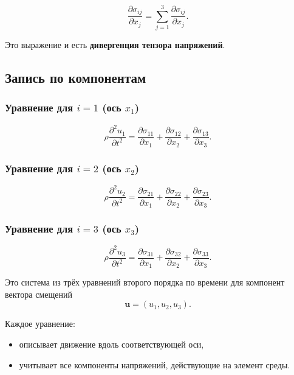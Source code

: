 \[
\frac{\partial \sigma_{ij}}{\partial x_j}
=
\sum_{j=1}^{3}
\frac{\partial \sigma_{ij}}{\partial x_j}.
\]

Это выражение и есть \textbf{дивергенция тензора напряжений}.

\subsection{Запись по компонентам}

\subsubsection{Уравнение для $i=1$ (ось $x_1$)}

\begin{equation}
\rho \frac{\partial^2 u_1}{\partial t^2}
=
\frac{\partial \sigma_{11}}{\partial x_1}
+
\frac{\partial \sigma_{12}}{\partial x_2}
+
\frac{\partial \sigma_{13}}{\partial x_3}.
\end{equation}

\subsubsection{Уравнение для $i=2$ (ось $x_2$)}

\begin{equation}
\rho \frac{\partial^2 u_2}{\partial t^2}
=
\frac{\partial \sigma_{21}}{\partial x_1}
+
\frac{\partial \sigma_{22}}{\partial x_2}
+
\frac{\partial \sigma_{23}}{\partial x_3}.
\end{equation}

\subsubsection{Уравнение для $i=3$ (ось $x_3$)}

\begin{equation}
\rho \frac{\partial^2 u_3}{\partial t^2}
=
\frac{\partial \sigma_{31}}{\partial x_1}
+
\frac{\partial \sigma_{32}}{\partial x_2}
+
\frac{\partial \sigma_{33}}{\partial x_3}.
\end{equation}

Это система из трёх уравнений второго порядка по времени для компонент вектора смещений
\[
\mathbf{u} = (u_1,u_2,u_3).
\]

Каждое уравнение:
\begin{itemize}
    \item описывает движение вдоль соответствующей оси,
    \item учитывает все компоненты напряжений, действующие на элемент среды.
\end{itemize}

